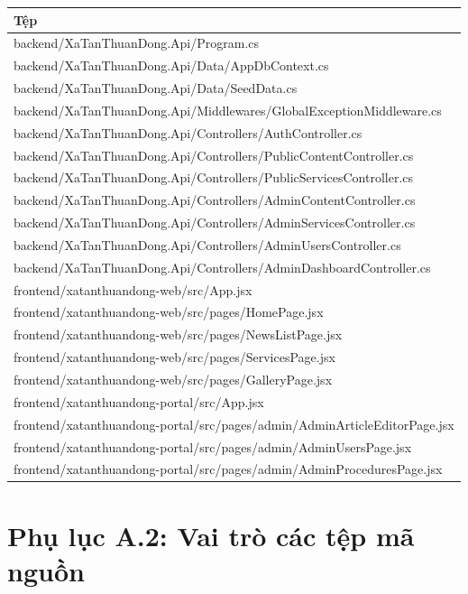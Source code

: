 \documentclass[12pt,a4paper]{article}
\begin{document}
\renewcommand{\arraystretch}{1.25}

\begin{longtable}{p{14cm}}
	\toprule
	\textbf{Tệp} \\
	\midrule
	backend/XaTanThuanDong.Api/Program.cs \\
	backend/XaTanThuanDong.Api/Data/AppDbContext.cs \\
	backend/XaTanThuanDong.Api/Data/SeedData.cs \\
	backend/XaTanThuanDong.Api/Middlewares/GlobalExceptionMiddleware.cs \\
	backend/XaTanThuanDong.Api/Controllers/AuthController.cs \\
	backend/XaTanThuanDong.Api/Controllers/PublicContentController.cs \\
	backend/XaTanThuanDong.Api/Controllers/PublicServicesController.cs \\
	backend/XaTanThuanDong.Api/Controllers/AdminContentController.cs \\
	backend/XaTanThuanDong.Api/Controllers/AdminServicesController.cs \\
	backend/XaTanThuanDong.Api/Controllers/AdminUsersController.cs \\
	backend/XaTanThuanDong.Api/Controllers/AdminDashboardController.cs \\
	frontend/xatanthuandong-web/src/App.jsx \\
	frontend/xatanthuandong-web/src/pages/HomePage.jsx \\
	frontend/xatanthuandong-web/src/pages/NewsListPage.jsx \\
	frontend/xatanthuandong-web/src/pages/ServicesPage.jsx \\
	frontend/xatanthuandong-web/src/pages/GalleryPage.jsx \\
	frontend/xatanthuandong-portal/src/App.jsx \\
	frontend/xatanthuandong-portal/src/pages/admin/AdminArticleEditorPage.jsx \\
	frontend/xatanthuandong-portal/src/pages/admin/AdminUsersPage.jsx \\
	frontend/xatanthuandong-portal/src/pages/admin/AdminProceduresPage.jsx \\
	\bottomrule
\end{longtable}

\section*{Phụ lục A.2: Vai trò các tệp mã nguồn}
\end{document}
